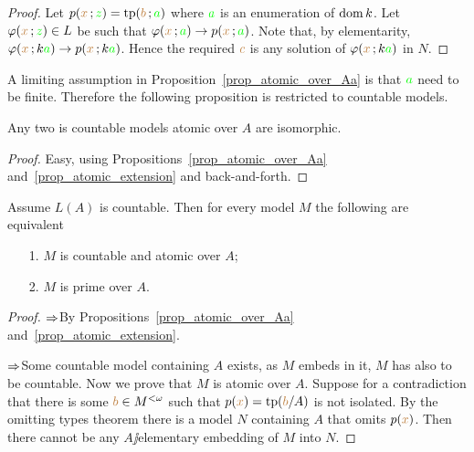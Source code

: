 \documentclass[creche.tex]{subfiles}
\begin{document}
\begin{proof}
Let $p({\color{brown} x}\,;{\color{green} z})={\rm tp}({\color{brown} b}\,;{\color{green} a})$ where ${\color{green} a}$ is an enumeration of $\mathop{\rm dom} k$. Let $\varphi({\color{brown} x}\,;{\color{green} z})\in L$ be such that $\varphi({\color{brown} x}\,;{\color{green} a})\rightarrow p({\color{brown} x}\,;{\color{green} a})$. Note that, by elementarity, $\varphi({\color{brown} x}\,;k{\color{green} a})\rightarrow p({\color{brown} x}\,;k{\color{green} a})$. Hence the required ${\color{brown} c}$ is any solution of $\varphi({\color{brown} x}\,;k{\color{green} a})$ in $N$. 
\end{proof}

A limiting assumption in Proposition~\ref{prop_atomic_over_Aa} is that ${\color{green} a}$ need to be finite. Therefore the following proposition is restricted to countable models.


\begin{proposition}\label{prop_atomic_unique}
Any two is countable models atomic over $A$ are isomorphic.
\end{proposition}

\begin{proof}
Easy, using Propositions~\ref{prop_atomic_over_Aa} and~\ref{prop_atomic_extension} and back-and-forth.
\end{proof}

\begin{proposition} 
Assume $L(A)$ is countable. Then for every model $M$ the following are equivalent
\begin{itemize}
\item[1.] $M$ is countable and atomic over $A$;
\item[2.] $M$ is prime over $A$.
\end{itemize}
\end{proposition}

\begin{proof}
$\Rightarrow$\quad By Propositions~\ref{prop_atomic_over_Aa} and~\ref{prop_atomic_extension}.


$\Rightarrow$\quad Some countable model containing $A$ exists, as $M$ embeds in it, $M$ has also to be countable. Now we prove that $M$ is atomic over $A$. Suppose for a contradiction that there is some ${\color{brown} b}\in M^{<\omega}$ such that $p({\color{brown} x})={\rm tp}({\color{brown} b}/A)$ is not isolated. By the omitting types theorem there is a model $N$ containing $A$ that omits $p({\color{brown} x})$. Then there cannot be any $A\jj$elementary embedding of $M$ into $N$.
\end{proof}
\end{document}
